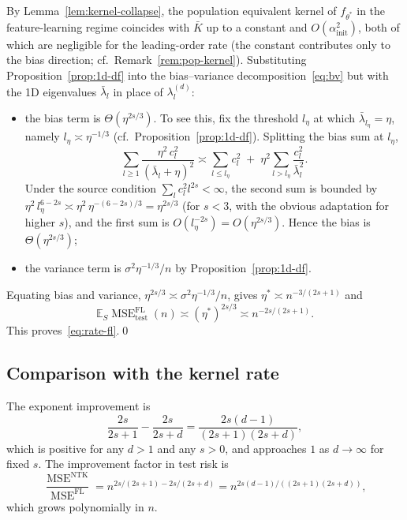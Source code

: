 \documentclass[12pt]{amsart}
\theoremstyle{definition}
\theoremstyle{remark}
\DeclareMathOperator{\MSE}{MSE}
\newcommand{\E}{\mathbb{E}}
\begin{document}
By Lemma~\ref{lem:kernel-collapse}, the population equivalent kernel of
$f_{\theta^{*}}$ in the feature-learning regime coincides with $\bar K$ up
to a constant and $O(\alpha_{\mathrm{init}}^{2})$, both of which are
negligible for the leading-order rate (the constant contributes only to the
bias direction; cf.\ Remark~\ref{rem:pop-kernel}). Substituting Proposition~\ref{prop:1d-df} into the
bias--variance decomposition~\eqref{eq:bv} but with the 1D eigenvalues
$\bar\lambda_{l}$ in place of $\lambda_{l}^{(d)}$:

\begin{itemize}
\item the bias term is $\Theta(\eta^{2s/3})$. To see this, fix the
  threshold $l_{\eta}$ at which $\bar\lambda_{l_{\eta}} = \eta$, namely
  $l_{\eta} \asymp \eta^{-1/3}$ (cf.\
  Proposition~\ref{prop:1d-df}). Splitting the bias sum at $l_{\eta}$,
  \[
    \sum_{l \ge 1} \frac{\eta^{2}\, c_{l}^{2}}{(\bar\lambda_{l} + \eta)^{2}}
    \asymp
    \sum_{l \le l_{\eta}} c_{l}^{2}
    \;+\; \eta^{2}\!\!\sum_{l > l_{\eta}} \frac{c_{l}^{2}}{\bar\lambda_{l}^{2}}.
  \]
  Under the source condition $\sum_{l} c_{l}^{2} l^{2s} < \infty$, the
  second sum is bounded by $\eta^{2}\, l_{\eta}^{6-2s}
  \asymp \eta^{2}\, \eta^{-(6-2s)/3} = \eta^{2s/3}$ (for $s < 3$,
  with the obvious adaptation for higher $s$), and the first sum is
  $O(l_{\eta}^{-2s}) = O(\eta^{2s/3})$. Hence the bias is
  $\Theta(\eta^{2s/3})$;

\item the variance term is $\sigma^{2} \eta^{-1/3}/n$ by
  Proposition~\ref{prop:1d-df}.
\end{itemize}

Equating bias and variance, $\eta^{2s/3} \asymp \sigma^{2} \eta^{-1/3}/n$,
gives $\eta^{*} \asymp n^{-3/(2s+1)}$ and
\[
  \E_{S} \MSE_{\mathrm{test}}^{\mathrm{FL}}(n)
  \asymp (\eta^{*})^{2s/3}
  \asymp n^{-2s/(2s+1)}.
\]
This proves~\eqref{eq:rate-fl}.\qed

\subsection{Comparison with the kernel rate}

The exponent improvement is
\[
  \frac{2s}{2s+1} - \frac{2s}{2s+d}
  = \frac{2s(d-1)}{(2s+1)(2s+d)},
\]
which is positive for any $d > 1$ and any $s > 0$, and approaches $1$ as
$d \to \infty$ for fixed $s$. The improvement factor in test risk is
\[
  \frac{\MSE^{\mathrm{NTK}}}{\MSE^{\mathrm{FL}}}
  = n^{2s/(2s+1) - 2s/(2s+d)}
  = n^{2s(d-1)/((2s+1)(2s+d))},
\]
which grows polynomially in $n$.
\end{document}
